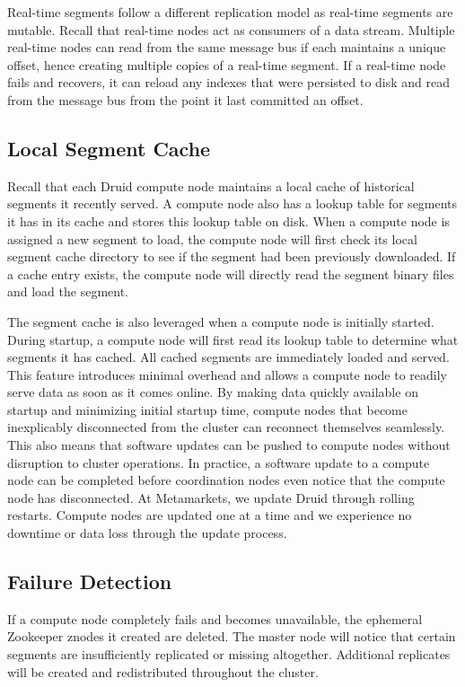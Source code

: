 \documentclass{vldb}
\begin{document}
Real-time segments follow a different replication model as real-time
segments are mutable. Recall that real-time nodes act as consumers of
a data stream. Multiple real-time nodes can read from the same message
bus if each maintains a unique offset, hence creating multiple copies
of a real-time segment. If a real-time node fails and recovers, it can
reload any indexes that were persisted to disk and read from the
message bus from the point it last committed an offset.

\subsection{Local Segment Cache}
Recall that each Druid compute node maintains a local cache of
historical segments it recently served. A compute node also has a
lookup table for segments it has in its cache and stores this lookup
table on disk. When a compute node is assigned a new segment to load,
the compute node will first check its local segment cache directory to
see if the segment had been previously downloaded. If a cache entry
exists, the compute node will directly read the segment binary files
and load the segment.

The segment cache is also leveraged when a compute node is initially
started. During startup, a compute node will first read its lookup
table to determine what segments it has cached. All cached segments
are immediately loaded and served. This feature introduces minimal
overhead and allows a compute node to readily serve data as soon as it
comes online. By making data quickly available on startup and
minimizing initial startup time, compute nodes that become
inexplicably disconnected from the cluster can reconnect themselves
seamlessly. This also means that software updates can be pushed to
compute nodes without disruption to cluster operations. In practice, a
software update to a compute node can be completed before coordination
nodes even notice that the compute node has disconnected. At
Metamarkets, we update Druid through rolling restarts. Compute nodes
are updated one at a time and we experience no downtime or data loss
through the update process.

\subsection{Failure Detection}
If a compute node completely fails and becomes unavailable, the
ephemeral Zookeeper znodes it created are deleted. The master node
will notice that certain segments are insufficiently replicated or
missing altogether. Additional replicates will be created and
redistributed throughout the cluster.
\end{document}
